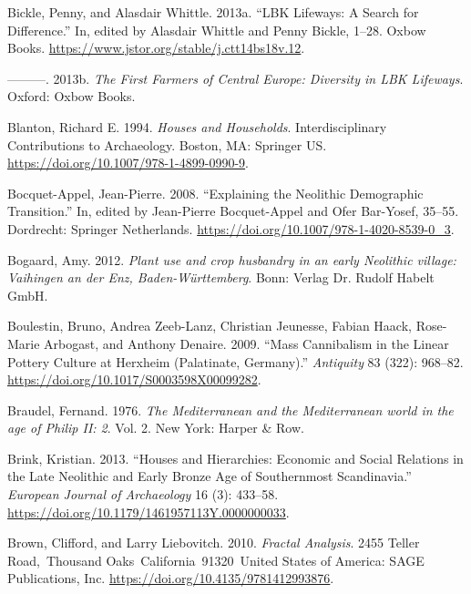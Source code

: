 \documentclass[
  12pt,
  a4paper, twoside]{book}
\newlength{\cslhangindent}
\newlength{\cslentryspacingunit} %
\newenvironment{CSLReferences}[2] %
 {%
  \setlength{\parindent}{0pt}
  \ifodd #1
  \let\oldpar\par
  \def\par{\hangindent=\cslhangindent\oldpar}
  \fi
  \setlength{\parskip}{#2\cslentryspacingunit}
 }%
 {}
\begin{document}
\begin{CSLReferences}{1}{0}
\leavevmode{}%
Bickle, Penny, and Alasdair Whittle. 2013a. {``LBK Lifeways: A Search for Difference.''} In, edited by Alasdair Whittle and Penny Bickle, 1--28. Oxbow Books. \url{https://www.jstor.org/stable/j.ctt14bs18v.12}.

\leavevmode{}%
---------. 2013b. \emph{The First Farmers of Central Europe: Diversity in LBK Lifeways}. Oxford: Oxbow Books.

\leavevmode{}%
Blanton, Richard E. 1994. \emph{Houses and Households}. Interdisciplinary Contributions to Archaeology. Boston, MA: Springer US. \url{https://doi.org/10.1007/978-1-4899-0990-9}.

\leavevmode{}%
Bocquet-Appel, Jean-Pierre. 2008. {``Explaining the Neolithic Demographic Transition.''} In, edited by Jean-Pierre Bocquet-Appel and Ofer Bar-Yosef, 35--55. Dordrecht: Springer Netherlands. \url{https://doi.org/10.1007/978-1-4020-8539-0_3}.

\leavevmode{}%
Bogaard, Amy. 2012. \emph{Plant use and crop husbandry in an early Neolithic village: Vaihingen an der Enz, Baden-Württemberg}. Bonn: Verlag Dr. Rudolf Habelt GmbH.

\leavevmode{}%
Boulestin, Bruno, Andrea Zeeb-Lanz, Christian Jeunesse, Fabian Haack, Rose-Marie Arbogast, and Anthony Denaire. 2009. {``Mass Cannibalism in the Linear Pottery Culture at Herxheim (Palatinate, Germany).''} \emph{Antiquity} 83 (322): 968--82. \url{https://doi.org/10.1017/S0003598X00099282}.

\leavevmode{}%
Braudel, Fernand. 1976. \emph{The Mediterranean and the Mediterranean world in the age of Philip II: 2}. Vol. 2. New York: Harper \& Row.

\leavevmode{}%
Brink, Kristian. 2013. {``Houses and Hierarchies: Economic and Social Relations in the Late Neolithic and Early Bronze Age of Southernmost Scandinavia.''} \emph{European Journal of Archaeology} 16 (3): 433--58. \url{https://doi.org/10.1179/1461957113Y.0000000033}.

\leavevmode{}%
Brown, Clifford, and Larry Liebovitch. 2010. \emph{Fractal Analysis}. 2455 Teller Road,~Thousand Oaks~California~91320~United States of America: SAGE Publications, Inc. \url{https://doi.org/10.4135/9781412993876}.


\end{CSLReferences}
\end{document}
